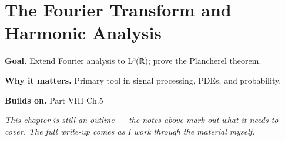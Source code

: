 \chapter{The Fourier Transform and Harmonic Analysis}
\label{ch:08-complex-analysis-and-harmonic-analysis-06}

\begin{chapterintro}
\textbf{Goal.} Extend Fourier analysis to L²(ℝ); prove the Plancherel theorem.

\textbf{Why it matters.} Primary tool in signal processing, PDEs, and probability.

\textbf{Builds on.} Part VIII Ch.5
\end{chapterintro}

\textit{This chapter is still an outline --- the notes above mark out what it needs to cover. The full write-up comes as I work through the material myself.}
